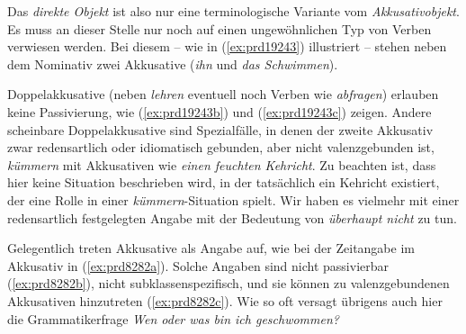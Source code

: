 
Das \textit{direkte Objekt} ist also nur eine terminologische Variante vom \textit{Akkusativobjekt}.
Es muss an dieser Stelle nur noch auf einen ungewöhnlichen Typ von Verben verwiesen werden.
Bei diesem -- wie in (\ref{ex:prd19243}) illustriert -- stehen neben dem Nominativ zwei Akkusative (\textit{ihn} und \textit{das Schwimmen}).

\begin{exe}
  \ex\label{ex:prd19243}
  \begin{xlist}
  \end{xlist}
\end{exe}


Doppelakkusative (neben \textit{lehren} eventuell noch Verben wie \textit{abfragen}) erlauben keine Passivierung, wie (\ref{ex:prd19243b}) und (\ref{ex:prd19243c}) zeigen.
Andere scheinbare Doppelakkusative sind Spezialfälle, in denen der zweite Akkusativ zwar redensartlich oder idiomatisch gebunden, aber nicht valenzgebunden ist, \zB \textit{kümmern} mit Akkusativen wie \textit{einen feuchten Kehricht}.
Zu beachten ist, dass hier keine Situation beschrieben wird, in der tatsächlich ein Kehricht existiert, der eine Rolle in einer \textit{kümmern}-Situation spielt.
Wir haben es vielmehr mit einer redensartlich festgelegten Angabe mit der Bedeutung von \textit{überhaupt nicht} zu tun.

Gelegentlich treten Akkusative als Angabe auf, wie bei der Zeitangabe im Akkusativ in (\ref{ex:prd8282a}).
Solche Angaben sind nicht passivierbar (\ref{ex:prd8282b}), nicht subklassenspezifisch, und sie können zu valenzgebundenen Akkusativen hinzutreten (\ref{ex:prd8282c}).
Wie so oft versagt übrigens auch hier die Grammatikerfrage \textit{Wen oder was bin ich geschwommen?}

\begin{exe}
  \ex\label{ex:prd8282}
  \begin{xlist}
  \end{xlist} 
\end{exe}


